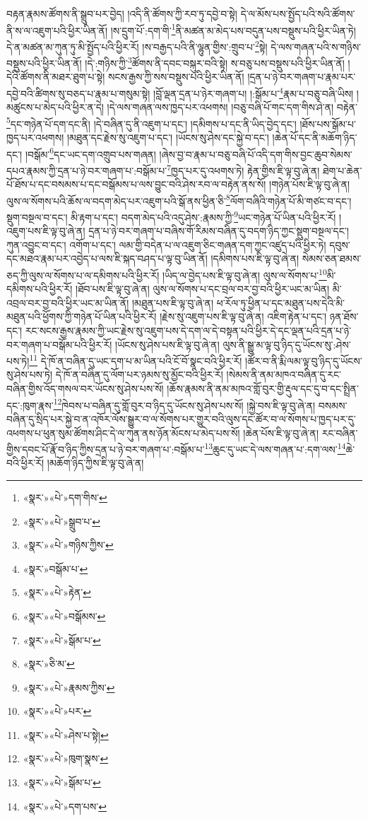 བརྟན་རྣམས་ཚོགས་ནི་སྒྲུབ་པར་བྱེད། །འདི་ནི་ཚོགས་ཀྱི་རབ་ཏུ་དབྱེ་བ་སྟེ། དེ་ལ་མོས་པས་སྤྱོད་པའི་སའི་ཚོགས་ནི་ས་ལ་འཇུག་པའི་ཕྱིར་ཡིན་ནོ། །ས་དྲུག་པོ་:དག་གི་\footnote{«སྣར་»«པེ་»དག་གིས་}ནི་མཚན་མ་མེད་པས་བདུན་པས་བསྡུས་པའི་ཕྱིར་ཡིན་ཏེ། དེ་ན་མཚན་མ་ཀུན་ཏུ་མི་སྤྱོད་པའི་ཕྱིར་རོ། །ས་བརྒྱད་པའི་ནི་ལྷུན་གྱིས་:གྲུབ་པ་\footnote{«སྣར་»«པེ་»སྒྲུབ་པ་}སྟེ། དེ་ལས་གཞན་པའི་ས་གཉིས་བསྡུས་པའི་ཕྱིར་ཡིན་ནོ། །དེ་:གཉིས་ཀྱི་\footnote{«སྣར་»«པེ་»གཉིས་ཀྱིས་}ཚོགས་ནི་དབང་བསྐུར་བའི་སྟེ། ས་བཅུ་པས་བསྡུས་པའི་ཕྱིར་ཡིན་ནོ། །དེའི་ཚོགས་ནི་མཐར་ཐུག་པ་སྟེ། སངས་རྒྱས་ཀྱི་སས་བསྡུས་པའི་ཕྱིར་ཡིན་ནོ། །དྲན་པ་ཉེ་བར་གཞག་པ་རྣམ་པར་དབྱེ་བའི་ཚིགས་སུ་བཅད་པ་རྣམ་པ་གསུམ་སྟེ། །བློ་ལྡན་དྲན་པ་ཉེར་གཞག་པ། །:སྒོམ་པ་\footnote{«སྣར་»བསྒོམ་པ་}རྣམ་པ་བཅུ་བཞི་ཡིས། །མཚུངས་པ་མེད་པའི་ཕྱིར་ན་དེ། །དེ་ལས་གཞན་ལས་ཁྱད་པར་འཕགས། །བཅུ་བཞི་པོ་གང་དག་གིས་ཤེ་ན། བརྟེན་\footnote{«སྣར་»«པེ་»རྟེན་}དང་གཉེན་པོ་དག་དང་ནི། །དེ་བཞིན་དུ་ནི་འཇུག་པ་དང་། །དམིགས་པ་དང་ནི་ཡིད་བྱེད་དང་། །ཐོས་པས་སྒོམ་པ་ཁྱད་པར་འཕགས། །མཐུན་དང་རྗེས་སུ་འཇུག་པ་དང་། །ཡོངས་སུ་ཤེས་དང་སྐྱེ་བ་དང་། །ཆེན་པོ་དང་ནི་མཆོག་ཉིད་དང་། །བསྒོམ་\footnote{«སྣར་»«པེ་»བསྒོམས་}དང་ཡང་དག་འགྲུབ་པས་གཞན། །ཞེས་བྱ་བ་རྣམ་པ་བཅུ་བཞི་པོ་འདི་དག་གིས་བྱང་ཆུབ་སེམས་དཔའ་རྣམས་ཀྱི་དྲན་པ་ཉེ་བར་གཞག་པ་:བསྒོམ་པ་\footnote{«སྣར་»«པེ་»སྒོམ་པ་}ཁྱད་པར་དུ་འཕགས་ཏེ། རྟེན་གྱིས་ཇི་ལྟ་བུ་ཞེ་ན། ཐེག་པ་ཆེན་པོ་ཐོས་པ་དང་བསམས་པ་དང་བསྒོམས་པ་ལས་བྱུང་བའི་ཤེས་རབ་ལ་བརྟེན་ནས་སོ། །གཉེན་པོས་ཇི་ལྟ་བུ་ཞེ་ན། ལུས་ལ་སོགས་པའི་ཆོས་ལ་བདག་མེད་པར་འཇུག་པའི་སྒོ་ནས་ཕྱིན་ཅི་\footnote{«སྣར་»ཅི་མ་}ལོག་བཞིའི་གཉེན་པོ་མི་གཙང་བ་དང་། སྡུག་བསྔལ་བ་དང་། མི་རྟག་པ་དང་། བདག་མེད་པའི་འདུ་ཤེས་:རྣམས་ཀྱི་\footnote{«སྣར་»«པེ་»རྣམས་ཀྱིས་}ཡང་གཉེན་པོ་ཡིན་པའི་ཕྱིར་རོ། །འཇུག་པས་ཇི་ལྟ་བུ་ཞེ་ན། དྲན་པ་ཉེ་བར་གཞག་པ་བཞིས་གོ་རིམས་བཞིན་དུ་བདག་ཉིད་ཀྱང་སྡུག་བསྔལ་དང་། ཀུན་འབྱུང་བ་དང་། འགོག་པ་དང་། ལམ་གྱི་བདེན་པ་ལ་འཇུག་ཅིང་གཞན་དག་ཀྱང་འཛུད་པའི་ཕྱིར་ཏེ། དབུས་དང་མཐའ་རྣམ་པར་འབྱེད་པ་ལས་ཇི་སྐད་བཤད་པ་ལྟ་བུ་ཡིན་ནོ། །དམིགས་པས་ཇི་ལྟ་བུ་ཞེ་ན། སེམས་ཅན་ཐམས་ཅད་ཀྱི་ལུས་ལ་སོགས་པ་ལ་དམིགས་པའི་ཕྱིར་རོ། །ཡིད་ལ་བྱེད་པས་ཇི་ལྟ་བུ་ཞེ་ན། ལུས་ལ་སོགས་པ་\footnote{«སྣར་»«པེ་»པར་}མི་དམིགས་པའི་ཕྱིར་རོ། །ཐོབ་པས་ཇི་ལྟ་བུ་ཞེ་ན། ལུས་ལ་སོགས་པ་དང་བྲལ་བར་བྱ་བའི་ཕྱིར་ཡང་མ་ཡིན། མི་འབྲལ་བར་བྱ་བའི་ཕྱིར་ཡང་མ་ཡིན་ནོ། །མཐུན་པས་ཇི་ལྟ་བུ་ཞེ་ན། ཕ་རོལ་ཏུ་ཕྱིན་པ་དང་མཐུན་པས་དེའི་མི་མཐུན་པའི་ཕྱོགས་ཀྱི་གཉེན་པོ་ཡིན་པའི་ཕྱིར་རོ། །རྗེས་སུ་འཇུག་པས་ཇི་ལྟ་བུ་ཞེ་ན། འཇིག་རྟེན་པ་དང་། ཉན་ཐོས་དང་། རང་སངས་རྒྱས་རྣམས་ཀྱི་ཡང་རྗེས་སུ་འཇུག་པས་དེ་དག་ལ་དེ་བསྟན་པའི་ཕྱིར་དེ་དང་ལྡན་པའི་དྲན་པ་ཉེ་བར་གཞག་པ་བསྒོམ་པའི་ཕྱིར་རོ། །ཡོངས་སུ་ཤེས་པས་ཇི་ལྟ་བུ་ཞེ་ན། ལུས་ནི་སྒྱུ་མ་ལྟ་བུ་ཉིད་དུ་ཡོངས་སུ་:ཤེས་པས་ཏེ།\footnote{«སྣར་»«པེ་»ཤེས་པ་སྟེ།} དེ་ཁོ་ན་བཞིན་དུ་ཡང་དག་པ་མ་ཡིན་པའི་ངོ་བོ་སྣང་བའི་ཕྱིར་རོ། །ཚོར་བ་ནི་རྨི་ལམ་ལྟ་བུ་ཉིད་དུ་ཡོངས་སུ་ཤེས་པས་ཏེ། དེ་ཁོ་ན་བཞིན་དུ་ལོག་པར་ཉམས་སུ་མྱོང་བའི་ཕྱིར་རོ། །སེམས་ནི་ནམ་མཁའ་བཞིན་དུ་རང་བཞིན་གྱིས་འོད་གསལ་བར་ཡོངས་སུ་ཤེས་པས་སོ། །ཆོས་རྣམས་ནི་ནམ་མཁའ་གློ་བུར་གྱི་རྡུལ་དང་དུ་བ་དང་སྤྲིན་དང་:ཁུག་རྣས་\footnote{«སྣར་»«པེ་»ཁུག་སྣས་}ཁེབས་པ་བཞིན་དུ་གློ་བུར་བ་ཉིད་དུ་ཡོངས་སུ་ཤེས་པས་སོ། །སྐྱེ་བས་ཇི་ལྟ་བུ་ཞེ་ན། བསམས་བཞིན་དུ་སྲིད་པར་སྐྱེ་བ་ན་འཁོར་ལོས་སྒྱུར་བ་ལ་སོགས་པར་གྱུར་བའི་ལུས་དང་ཚོར་བ་ལ་སོགས་པ་ཁྱད་པར་དུ་འཕགས་པ་ཕུན་སུམ་ཚོགས་ཤིང་དེ་ལ་ཀུན་ནས་ཉོན་མོངས་པ་མེད་པས་སོ། །ཆེན་པོས་ཇི་ལྟ་བུ་ཞེ་ན། རང་བཞིན་གྱིས་དབང་པོ་རྣོ་བ་ཉིད་ཀྱིས་དྲན་པ་ཉེ་བར་གཞག་པ་:བསྒོམ་པ་\footnote{«སྣར་»«པེ་»སྒོམ་པ་}ཆུང་དུ་ཡང་དེ་ལས་གཞན་པ་:དག་ལས་\footnote{«སྣར་»«པེ་»དག་པས་}ཆེ་བའི་ཕྱིར་རོ། །མཆོག་ཉིད་ཀྱིས་ཇི་ལྟ་བུ་ཞེ་ན། 